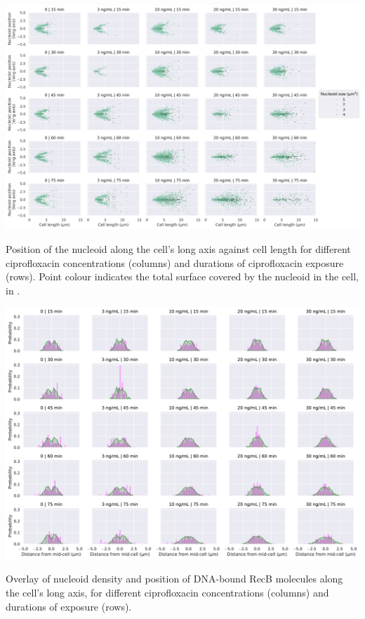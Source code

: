 \begin{suppfigure*}[htbp]
    \begin{center}
    \includegraphics[width=\textwidth]{SI_Figures/Nucleoid_position.png}
    \end{center}
    \caption{Position of the nucleoid along the cell's long axis against cell length for different ciprofloxacin concentrations (columns) and durations of ciprofloxacin exposure (rows). Point colour indicates the total surface covered by the nucleoid in the cell, in \umsq.}
    \label{SIFig:nucleoid_position}
\end{suppfigure*}

\begin{suppfigure*}[htbp]
    \begin{center}
    \includegraphics[width=\textwidth]{SI_Figures/RecB_Nucleoid_position_timepoints.pdf}
    \end{center}
    \caption{Overlay of nucleoid density and position of DNA-bound RecB molecules along the cell's long axis, for different ciprofloxacin concentrations (columns) and durations of exposure (rows).}
    \label{SIFig:recb_nucleoid_timepoints}
\end{suppfigure*}

